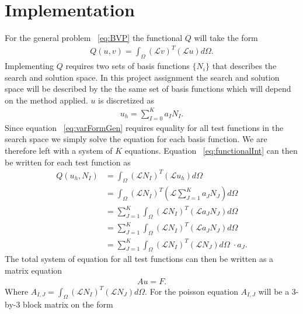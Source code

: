 
\chapter{Implementation} %

\label{chap:Implementation} %



 For the general problem ~\ref{eq:BVP} the functional $Q$ will take the form 
\begin{align}
	Q(u,v)=\int_{\Omega}(\mathcal{L}v)^T(\mathcal{L}u)d\Omega.
	\label{eq:functionalInt}
\end{align}
Implementing $Q$ requires two sets of basis functions $\{N_i\}$ that describes the search and solution space. In this project assignment the search and solution space will be described by the the same set of basis functions which will depend on the method applied. $u$ is discretized as 
\begin{align}
	u_h = \sum_{I=0}^{K}a_IN_I.
	\label{eq:uDisc}
\end{align}
Since equation ~\ref{eq:varFormGen} requires equality for all test functions in the search space we simply solve the equation for each basis function. We are therefore left with a system of $K$ equations. Equation ~\ref{eq:functionalInt} can then be written for each test function as  
\begin{align}
	Q(u_h,N_I) &= \int_{\Omega}(\mathcal{L}N_I)^T(\mathcal{L}u_h)d\Omega \\
	&= \int_{\Omega}(\mathcal{L}N_I)^T(\mathcal{L}\sum_{J=1}^Ka_JN_J)d\Omega \\
	&= \sum_{J=1}^K\int_{\Omega}(\mathcal{L}N_I)^T(\mathcal{L}a_JN_J)d\Omega \\
	&= \sum_{J=1}^K\int_{\Omega}(\mathcal{L}N_I)^T(\mathcal{L}a_JN_J)d\Omega \\
	&= \sum_{J=1}^K\int_{\Omega}(\mathcal{L}N_I)^T(\mathcal{L}N_J)d\Omega \;\cdot a_J.
	\label{eq:varFormDisc}
\end{align}
The total system of equation for all test functions can then be written as a matrix equation 
\begin{align}
	Au = F.
	\label{eq:matrixEq}
\end{align}
Where $A_{I,J}=\int_{\Omega}(\mathcal{L}N_I)^T(\mathcal{L}N_J)d\Omega$.
For the poisson equation $A_{I,J}$ will be a 3-by-3 block matrix on the form 

